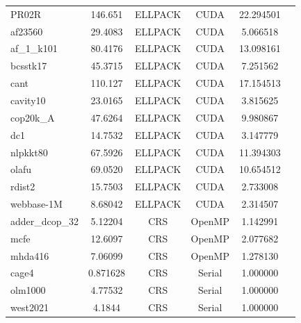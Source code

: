 \documentclass[12pt,oneside]{book} %
\begin{document}
\begin{longtable}{lccccr}
    PR02R             & 146.651                   & ELLPACK                 & CUDA                 & 22.294501        \\
    af23560           & 29.4083                   & ELLPACK                 & CUDA                 & 5.066518         \\
    af\_1\_k101       & 80.4176                   & ELLPACK                 & CUDA                 & 13.098161        \\
    bcsstk17          & 45.3715                   & ELLPACK                 & CUDA                 & 7.251562         \\
    cant              & 110.127                   & ELLPACK                 & CUDA                 & 17.154513        \\
    cavity10          & 23.0165                   & ELLPACK                 & CUDA                 & 3.815625         \\
    cop20k\_A         & 47.6264                   & ELLPACK                 & CUDA                 & 9.980867         \\
    dc1               & 14.7532                   & ELLPACK                 & CUDA                 & 3.147779         \\
    nlpkkt80          & 67.5926                   & ELLPACK                 & CUDA                 & 11.394303        \\
    olafu             & 69.0520                   & ELLPACK                 & CUDA                 & 10.654512        \\
    rdist2            & 15.7503                   & ELLPACK                 & CUDA                 & 2.733008         \\
    webbase-1M        & 8.68042                   & ELLPACK                 & CUDA                 & 2.314507         \\
    adder\_dcop\_32   & 5.12204                   & CRS                     & OpenMP               & 1.142991         \\
    mcfe              & 12.6097                   & CRS                     & OpenMP               & 2.077682         \\
    mhda416           & 7.06099                   & CRS                     & OpenMP               & 1.278130         \\
    cage4             & 0.871628                  & CRS                     & Serial               & 1.000000         \\
    olm1000           & 4.77532                   & CRS                     & Serial               & 1.000000         \\
    west2021          & 4.1844                    & CRS                     & Serial               & 1.000000         \\
\end{longtable}
\end{document}
